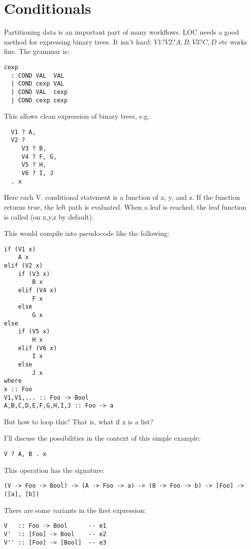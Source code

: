 \documentclass[12pt]{article}
\begin{document}
\section{Conditionals}

Partitioning data is an important part of many workflows. LOC needs a good
method for expressing binary trees. It isn't hard: $V1 ? V2 ? A, B, V3 ? C, D$ etc
works fine. The grammar is:

\begin{verbatim}
cexp
  : COND VAL  VAL
  | COND cexp VAL
  | COND VAL  cexp
  | COND cexp cexp
\end{verbatim}

This allows clean expression of binary trees, e.g.

\begin{verbatim}
  V1 ? A,
  V2 ?
     V3 ? B,
     V4 ? F, G,
     V5 ? H,
     V6 ? I, J
  . x
\end{verbatim}

Here each V. conditional statement is a function of x, y, and z. If the
function returns true, the left path is evaluated. When a leaf is reached, the
leaf function is called (on x,y,z by default).

This would compile into pseudocode like the following:

\begin{verbatim}
if (V1 x)
    A x
elif (V2 x)
    if (V3 x)
        B x
    elif (V4 x)
        F x
    else
        G x
else
    if (V5 x)
        H x
    elif (V6 x)
        I x
    else
        J x
where
x :: Foo
V1,V1,... :: Foo -> Bool
A,B,C,D,E,F,G,H,I,J :: Foo -> a
\end{verbatim}

But how to loop this? That is, what if x is a list?

I'll discuss the possibilities in the context of this simple example:

\begin{verbatim}
V ? A, B . x
\end{verbatim}

This operation has the signature:

\begin{verbatim}
(V -> Foo -> Bool) -> (A -> Foo -> a) -> (B -> Foo -> b) -> [Foo] -> ([a], [b])
\end{verbatim}

There are some variants in the first expression:

\begin{verbatim}
V   :: Foo -> Bool      -- e1
V'  :: [Foo] -> Bool    -- e2
V'' :: [Foo] -> [Bool]  -- e3
\end{verbatim}
\end{document}
